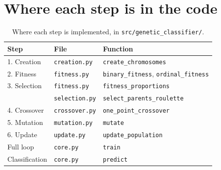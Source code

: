 \documentclass[11pt,a4paper]{article}
\newcommand{\cod}[1]{\texttt{#1}}
\begin{document}
\section{Where each step is in the code}

\begin{table}[ht]
\centering
\caption{Where each step is implemented, in \cod{src/genetic\_classifier/}.}
\begin{tabular}{lll}
\toprule
Step & File & Function \\
\midrule
1. Creation    & \cod{creation.py}   & \cod{create\_chromosomes} \\
2. Fitness     & \cod{fitness.py}    & \cod{binary\_fitness}, \cod{ordinal\_fitness} \\
3. Selection   & \cod{fitness.py}    & \cod{fitness\_proportions} \\
               & \cod{selection.py}  & \cod{select\_parents\_roulette} \\
4. Crossover   & \cod{crossover.py}  & \cod{one\_point\_crossover} \\
5. Mutation    & \cod{mutation.py}   & \cod{mutate} \\
6. Update      & \cod{update.py}     & \cod{update\_population} \\
Full loop      & \cod{core.py}       & \cod{train} \\
Classification & \cod{core.py}       & \cod{predict} \\
\bottomrule
\end{tabular}
\end{table}
\end{document}
